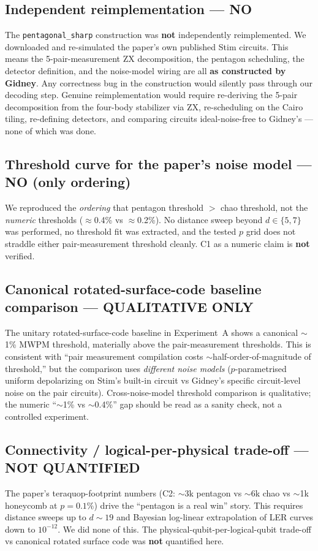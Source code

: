 \documentclass[11pt]{article}
\begin{document}
\subsection{Independent reimplementation --- NO}
The \texttt{pentagonal\_sharp} construction was \textbf{not} independently
reimplemented. We downloaded and re-simulated the paper's own published Stim
circuits. This means the 5-pair-measurement ZX decomposition, the pentagon
scheduling, the detector definition, and the noise-model wiring are all
\textbf{as constructed by Gidney}. Any correctness bug in the construction
would silently pass through our decoding step. Genuine reimplementation
would require re-deriving the 5-pair decomposition from the four-body
stabilizer via ZX, re-scheduling on the Cairo tiling, re-defining
detectors, and comparing circuits ideal-noise-free to Gidney's --- none of
which was done.

\subsection{Threshold curve for the paper's noise model --- NO (only ordering)}
We reproduced the \emph{ordering} that pentagon threshold $>$ chao threshold,
not the \emph{numeric} thresholds ($\approx$0.4\% vs $\approx$0.2\%). No
distance sweep beyond $d\in\{5,7\}$ was performed, no threshold fit was
extracted, and the tested $p$ grid does not straddle either pair-measurement
threshold cleanly. C1 as a numeric claim is \textbf{not} verified.

\subsection{Canonical rotated-surface-code baseline comparison --- QUALITATIVE ONLY}
The unitary rotated-surface-code baseline in Experiment~A shows a canonical
$\sim$1\% MWPM threshold, materially above the pair-measurement thresholds.
This is consistent with ``pair measurement compilation costs
$\sim$half-order-of-magnitude of threshold,'' but the comparison uses
\emph{different noise models} ($p$-parametrised uniform depolarizing on
Stim's built-in circuit vs Gidney's specific circuit-level noise on the pair
circuits). Cross-noise-model threshold comparison is qualitative; the
numeric ``$\sim$1\% vs $\sim$0.4\%'' gap should be read as a sanity check,
not a controlled experiment.

\subsection{Connectivity / logical-per-physical trade-off --- NOT QUANTIFIED}
The paper's teraquop-footprint numbers (C2: $\sim$3k pentagon vs $\sim$6k
chao vs $\sim$1k honeycomb at $p{=}0.1\%$) drive the ``pentagon is a real
win'' story. This requires distance sweeps up to $d\sim 19$ and Bayesian
log-linear extrapolation of LER curves down to $10^{-12}$. We did none of
this. The physical-qubit-per-logical-qubit trade-off vs canonical rotated
surface code was \textbf{not} quantified here.
\end{document}
